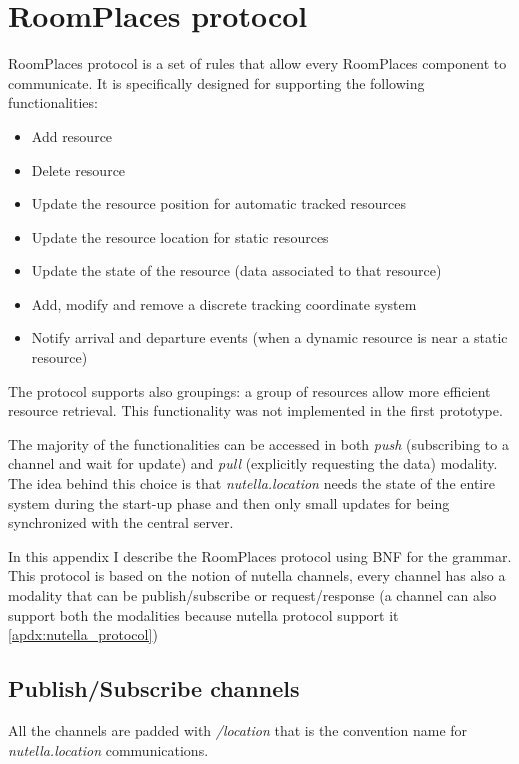 \chapter{RoomPlaces protocol}

\label{apdx:roomplaces_protocol}


RoomPlaces protocol is a set of rules that allow every RoomPlaces component to communicate. It is specifically designed for supporting the following functionalities:
\begin{itemize}
    \item Add resource
    \item Delete resource
    \item Update the resource position for automatic tracked resources
    \item Update the resource location for static resources
    \item Update the state of the resource (data associated to that resource)
    \item Add, modify and remove a discrete tracking coordinate system
    \item Notify arrival and departure events (when a dynamic resource is near a static resource)
\end{itemize}

The protocol supports also groupings: a group of resources allow more efficient resource retrieval. This functionality was not implemented in the first prototype.

The majority of the functionalities can be accessed in both \textit{push} (subscribing to a channel and wait for update) and \textit{pull} (explicitly requesting the data) modality. The idea behind this choice is that \textit{nutella.location} needs the state of the entire system during the start-up phase and then only small updates for being synchronized with the central server.

In this appendix I describe the RoomPlaces protocol using BNF \cite{naur:revised} for the grammar. This protocol is based on the notion of nutella channels, every channel has also a modality that can be publish/subscribe or request/response (a channel can also support both the modalities because nutella protocol support it \autoref{apdx:nutella_protocol})


\section{Publish/Subscribe channels}
All the channels are padded with \textit{/location} that is the convention name for \textit{nutella.location} communications.

